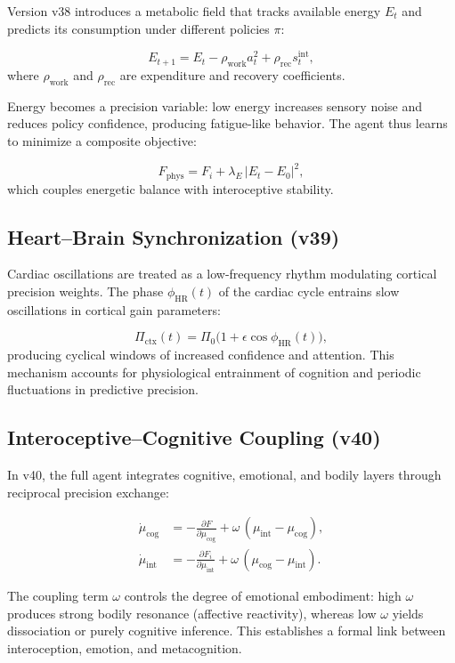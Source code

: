 \documentclass[9pt]{elife}
\begin{document}
Version v38 introduces a metabolic field that tracks available energy $E_t$
and predicts its consumption under different policies $\pi$:

\[
E_{t+1} = E_t - \rho_{\mathrm{work}} a_t^2 + \rho_{\mathrm{rec}} s_t^{\mathrm{int}},
\]
where $\rho_{\mathrm{work}}$ and $\rho_{\mathrm{rec}}$ are expenditure
and recovery coefficients.

Energy becomes a precision variable: low energy increases sensory noise
and reduces policy confidence, producing fatigue-like behavior.
The agent thus learns to minimize a composite objective:

\[
F_{\mathrm{phys}} = F_i + \lambda_E \, |E_t - E_0|^2,
\]
which couples energetic balance with interoceptive stability.

\subsection{Heart–Brain Synchronization (v39)}

Cardiac oscillations are treated as a low-frequency rhythm
modulating cortical precision weights.
The phase $\phi_{\mathrm{HR}}(t)$ of the cardiac cycle entrains
slow oscillations in cortical gain parameters:

\[
\Pi_{\mathrm{ctx}}(t) = \Pi_0 \big( 1 + \epsilon \cos \phi_{\mathrm{HR}}(t) \big),
\]
producing cyclical windows of increased confidence and attention.
This mechanism accounts for physiological entrainment of cognition
and periodic fluctuations in predictive precision.

\subsection{Interoceptive–Cognitive Coupling (v40)}

In v40, the full agent integrates cognitive, emotional, and bodily layers
through reciprocal precision exchange:

\begin{align}
\dot{\mu}_{\mathrm{cog}} &= -\frac{\partial F}{\partial \mu_{\mathrm{cog}}}
                           + \omega \, (\mu_{\mathrm{int}} - \mu_{\mathrm{cog}}), \\
\dot{\mu}_{\mathrm{int}} &= -\frac{\partial F_i}{\partial \mu_{\mathrm{int}}}
                           + \omega \, (\mu_{\mathrm{cog}} - \mu_{\mathrm{int}}).
\end{align}

The coupling term $\omega$ controls the degree of emotional embodiment:
high $\omega$ produces strong bodily resonance (affective reactivity),
whereas low $\omega$ yields dissociation or purely cognitive inference.
This establishes a formal link between interoception, emotion,
and metacognition.
\end{document}
